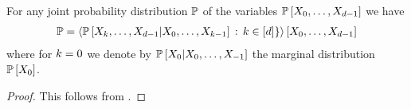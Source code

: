 \begin{theorem}\label{the:chainRule}
	For any joint probability distribution $\mathbb{P}$ of the variables $\mathbb{P}\left[X_{0},\ldots,X_{d-1}\right]$ we have
	\begin{align*}
		\mathbb{P} = \left\langle \mathbb{P}\left[X_{k},\ldots,X_{d-1}|X_{0},\ldots,X_{k-1}\right]\, : \, k\in[d]\}\right\rangle \left[ X_{0},\ldots,X_{d-1} \right] 
	\end{align*}
	where for $k=0$ we denote by $ \mathbb{P}\left[X_{0}|X_{0},\ldots,X_{-1}\right]$ the marginal distribution $\mathbb{P}\left[X_{0}\right]$.
\end{theorem}
\begin{proof}
	This follows from .
\end{proof}






